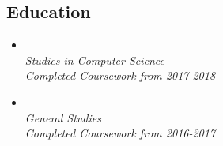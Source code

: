 \documentclass[11pt,oneside,a4paper,titlepage]{article}
\begin{document}
\begin{tcolorbox}
\begin{minipage}[t]{10cm}
\begin{tcolorbox}[grow to right by=1cm,colframe=white,colback=white]
      \vspace{-0.6cm}
      \section*{Education}
      \vspace{-0.2cm}
      \begin{itemize}[]
        \item{
            {}\\
            \emph{Studies in Computer Science}\\
            \emph{Completed Coursework from 2017-2018}
          }
        \item{
            {}\\
            \emph{General Studies}\\
            \emph{Completed Coursework from 2016-2017}
          }
      \end{itemize}
    \end{tcolorbox}
  \end{minipage}
\end{tcolorbox}
\end{document}
